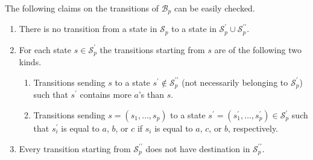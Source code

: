 \documentclass[11pt]{article}
\theoremstyle{remark}\newtheorem{remark}[theorem]{Remark}
\begin{document}
The following claims on the transitions of $\mathcal{B}_p$ can be easily checked.
\vspace{0.5em}
\begin{enumerate}[label={\footnotesize(t\arabic*)},labelindent=1em,itemsep=0.5em,topsep=0.5em]
	\setlength\itemsep{0.5em}
	\setcounter{enumi}{7}
	
	\item\label{ite:t8} There is no transition from a state in $\mathcal{S}_p$ to a state in $\mathcal{S}_p^\prime \cup \mathcal{S}_p^{\prime\prime}$.
	
	\item\label{ite:t9} For each state $s \in \mathcal{S}_p^\prime$ the transitions starting from $s$ are of the following two kinds.
	\vspace{0.5em}
	\begin{enumerate}[label={\footnotesize(t9\roman*)},labelindent=1em,itemsep=0.5em,topsep=0.5em]
		\setlength\itemsep{0.5em}
		
		\item Transitions sending $s$ to a state $s^\prime \notin \mathcal{S}_p^{\prime\prime}$ (not necessarily belonging to $\mathcal{S}_p^\prime$) such that $s^\prime$ contains more $a$'s than $s$.
		
		\item\label{ite:t9ii} Transitions sending $s = (s_1, \dots, s_p)$ to a state $s^\prime = (s_1^\prime, \dots, s_p^\prime) \in \mathcal{S}_p^\prime$ such that $s^\prime_i$ is equal to $a$, $b$, or $c$ if $s_i$ is equal to $a$, $c$, or $b$, respectively.
	\end{enumerate}
	
	\item\label{ite:t10} Every transition starting from $\mathcal{S}_p^{\prime\prime}$ does not have destination in $\mathcal{S}_p^{\prime\prime}$.
	
\end{enumerate}
\end{document}
